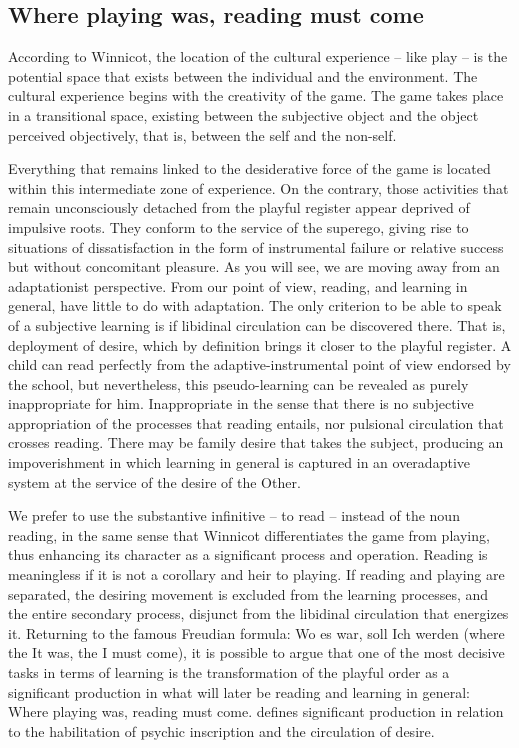 \documentclass[english]{textolivre}
\begin{document}
\subsection{Where playing was, reading must come}\label{sec-conduta}
According to Winnicot, the location of the cultural experience – like play – is the potential space that exists between the individual and the environment. The cultural experience begins with the creativity of the game. The game takes place in a transitional space, existing between the subjective object and the object perceived objectively, that is, between the self and the non-self.

Everything that remains linked to the desiderative force of the game is located within this intermediate zone of experience. On the contrary, those activities that remain unconsciously detached from the playful register appear deprived of impulsive roots. They conform to the service of the superego, giving rise to situations of dissatisfaction in the form of instrumental failure or relative success  but without concomitant pleasure. As you will see, we are moving away from an adaptationist perspective. From our point of view, reading, and learning in general, have little to do with adaptation. The only criterion to be able to speak of a subjective learning is if libidinal circulation can be discovered there. That is, deployment of desire, which by definition brings it closer to the playful register. A child can read perfectly from the adaptive-instrumental point of view endorsed by the school, but nevertheless, this pseudo-learning can be revealed as purely inappropriate for him. Inappropriate in the sense that there is no subjective appropriation of the processes that reading entails, nor pulsional circulation that crosses reading. There may be family desire that takes the subject, producing an impoverishment in which learning in general is captured in an overadaptive system at the service of the desire of the Other.

We prefer to use the substantive infinitive – to read – instead of the noun reading, in the same sense that Winnicot differentiates the game from playing, thus enhancing its character as a significant process and operation. Reading is meaningless if it is not a corollary and heir to playing. If reading and playing are separated, the desiring movement is excluded from the learning processes, and the entire secondary process, disjunct from the libidinal circulation that energizes it. Returning to the famous Freudian formula: Wo es war, soll Ich werden (where the It was, the I must come), it is possible to argue that one of the most decisive tasks in terms of learning is the transformation of the playful order as a significant production in what will later be reading and learning in general: Where playing was, reading must come. \textcite{casas_de_pereda_en_1999} defines significant production in relation to the habilitation of psychic inscription and the circulation of desire.
\end{document}
